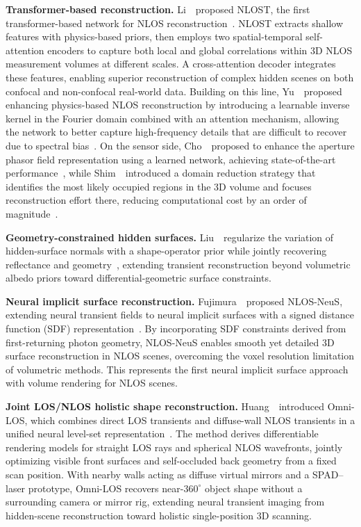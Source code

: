 \vspace{0.8mm}
\noindent \textbf{Transformer-based reconstruction.}
Li~\etal~proposed NLOST, the first transformer-based network for NLOS reconstruction~\cite{liNLOST2023}. NLOST extracts shallow features with physics-based priors, then employs two spatial-temporal self-attention encoders to capture both local and global correlations within 3D NLOS measurement volumes at different scales. A cross-attention decoder integrates these features, enabling superior reconstruction of complex hidden scenes on both confocal and non-confocal real-world data. Building on this line, Yu~\etal~proposed enhancing physics-based NLOS reconstruction by introducing a learnable inverse kernel in the Fourier domain combined with an attention mechanism, allowing the network to better capture high-frequency details that are difficult to recover due to spectral bias~\cite{yuEnhancingLearnable2023}. On the sensor side, Cho~\etal~proposed to enhance the aperture phasor field representation using a learned network, achieving state-of-the-art performance~\cite{choAperturePhasor2024}, while Shim~\etal~introduced a domain reduction strategy that identifies the most likely occupied regions in the 3D volume and focuses reconstruction effort there, reducing computational cost by an order of magnitude~\cite{shimDomainReduction2024}.

\vspace{0.8mm}
\noindent \textbf{Geometry-constrained hidden surfaces.}
Liu~\etal~regularize the variation of hidden-surface normals with a shape-operator prior while jointly recovering reflectance and geometry~\cite{liuGeometryConstrainedNLOS2026}, extending transient reconstruction beyond volumetric albedo priors toward differential-geometric surface constraints.

\vspace{0.8mm}
\noindent \textbf{Neural implicit surface reconstruction.}
Fujimura~\etal~proposed NLOS-NeuS, extending neural transient fields to neural implicit surfaces with a signed distance function (SDF) representation~\cite{fujimuraNLOSNeuS2023}. By incorporating SDF constraints derived from first-returning photon geometry, NLOS-NeuS enables smooth yet detailed 3D surface reconstruction in NLOS scenes, overcoming the voxel resolution limitation of volumetric methods. This represents the first neural implicit surface approach with volume rendering for NLOS scenes.

\vspace{0.8mm}
\noindent \textbf{Joint LOS/NLOS holistic shape reconstruction.}
Huang~\etal~introduced Omni-LOS, which combines direct LOS transients and diffuse-wall NLOS transients in a unified neural level-set representation~\cite{huangOmniLOS2023}. The method derives differentiable rendering models for straight LOS rays and spherical NLOS wavefronts, jointly optimizing visible front surfaces and self-occluded back geometry from a fixed scan position. With nearby walls acting as diffuse virtual mirrors and a SPAD--laser prototype, Omni-LOS recovers near-$360^\circ$ object shape without a surrounding camera or mirror rig, extending neural transient imaging from hidden-scene reconstruction toward holistic single-position 3D scanning.

